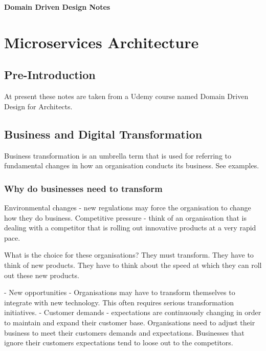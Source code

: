 \documentclass[a4paper, 11pt]{book}
\begin{document}
    \begin{titlepage}
        \centering
        \vspace*{2in}
        \Huge \textbf{Domain Driven Design Notes}
    \end{titlepage}

    \setcounter{section}{0}

    \newpage

    \tableofcontents
    \newpage

    \listoffigures
    \newpage


    \chapter{Microservices Architecture}


    \section{Pre-Introduction}
    At present these notes are taken from a Udemy course named Domain Driven Design for Architects.


    \section{Business and Digital Transformation}
    Business transformation is an umbrella term that is used for referring to fundamental changes in how an organisation conducts its business.
    See examples.

    \subsection{Why do businesses need to transform}
    \begin{itemize}
    Environmental changes - new regulations may force the organisation to change how they do business.
    Competitive pressure - think of an organisation that is dealing with a competitor that is rolling out innovative products at a very rapid pace.
    \end{itemize}

    What is the choice for these organisations?
    They must transform.
    They have to think of new products.
    They have to think about the speed at which they can roll out these new products.

    - New opportunities - Organisations may have to transform themselves to integrate with new technology.
    This often requires serious transformation initiatives.
    - Customer demands - expectations are continuously changing in order to maintain and expand their customer base.
    Organisations need to adjust their business to meet their customers demands and expectations.
    Businesses that ignore their customers expectations tend to loose out to the competitors.
\end{document}

